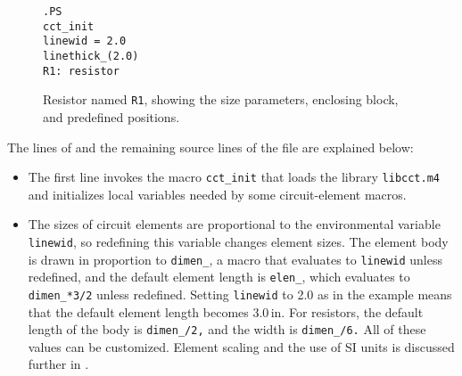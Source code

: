 \begin{figure}[ht]
   \parbox{2in}{\tt .PS\\ \hbox{}\quad cct\_init\\ \hbox{}\quad linewid = 2.0\\ 
     \hbox{}\quad linethick\_(2.0)\\ R1: resistor}
   \raisebox{-0.3in}{\hbox{}}
   \caption{Resistor named {\tt R1}, showing the size parameters,
     enclosing block, and predefined positions.}
   \label{BigResistor}
   \end{figure}
The lines of 
and the remaining source lines of the file are explained below:
\begin{itemize}
\item The first line invokes the macro {\tt cct\_init} that
   loads the library {\tt libcct.m4} 
   and initializes local variables needed by some circuit-element macros.

\item
   The sizes of circuit elements are proportional to the \pic environmental
   variable {\tt linewid}, so redefining this variable changes element
   sizes.  The element body is drawn in proportion to {\tt dimen\_},
   a macro that evaluates to {\tt linewid} unless redefined, and the default
   element length is {\tt elen\_}, which evaluates to
   {\tt dimen\_*3/2} unless redefined.
   Setting {\tt linewid} to 2.0 as in the example means that the default element
   length becomes 3.0\,in.
   For resistors, the default length of the body is {\tt dimen\_/2,} and the
   width is {\tt dimen\_/6.} All of these values can be customized.
   Element scaling and the use of SI units is discussed further in
   .


\end{itemize}
